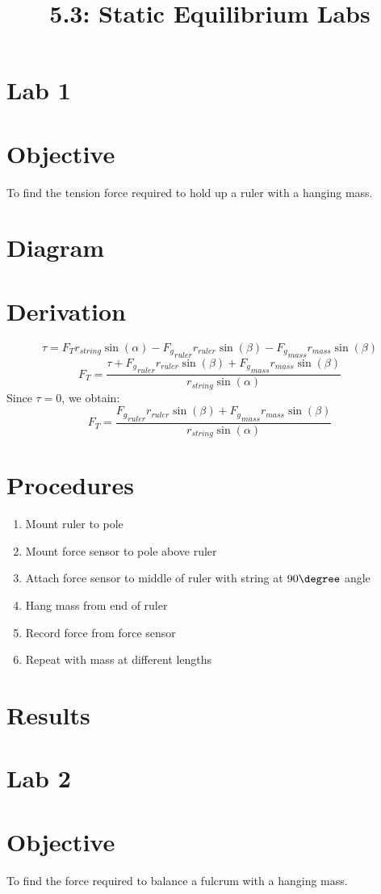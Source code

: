\documentclass{article}
\title{5.3: Static Equilibrium Labs}
\begin{document}
\section{Lab 1}
\section*{Objective}
To find the tension force required to hold up a ruler with a hanging mass.
\section*{Diagram}
\section*{Derivation}
\[\tau = F_Tr_{string}\sin(\alpha) - {F_g}_{ruler}r_{ruler}\sin(\beta) - {F_g}_{mass}r_{mass}\sin(\beta)\]
\[F_T = \frac{\tau + {F_g}_{ruler}r_{ruler}\sin(\beta) + {F_g}_{mass}r_{mass}\sin(\beta)}{r_{string}\sin(\alpha)}\]
Since $\tau = 0$, we obtain:
\[F_T = \frac{{F_g}_{ruler}r_{ruler}\sin(\beta) + {F_g}_{mass}r_{mass}\sin(\beta)}{r_{string}\sin(\alpha)}\]
\section*{Procedures}
\begin{enumerate}
    \item Mount ruler to pole
    \item Mount force sensor to pole above ruler
    \item Attach force sensor to middle of ruler with string at $90\degree$ angle
    \item Hang mass from end of ruler
    \item Record force from force sensor
    \item Repeat with mass at different lengths
\end{enumerate}
\section*{Results}

\section{Lab 2}
\section*{Objective}
To find the force required to balance a fulcrum with a hanging mass.
\end{document}
